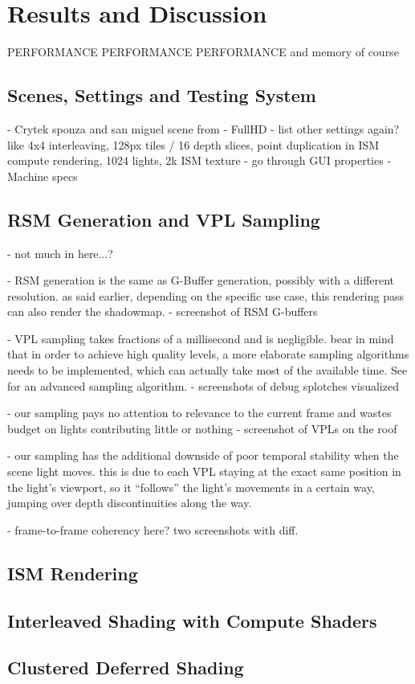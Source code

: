 

\chapter{Results and Discussion}

PERFORMANCE PERFORMANCE PERFORMANCE
and memory of course
\section{Scenes, Settings and Testing System}
- Crytek sponza and san miguel scene from \citep{McGuire2011Data}
- FullHD
- list other settings again? like 4x4 interleaving, 128px tiles / 16 depth slices, point duplication in ISM compute rendering, 1024 lights, 2k ISM texture
    - go through GUI properties
- Machine specs

\section{RSM Generation and VPL Sampling}
- not much in here...?

- RSM generation is the same as G-Buffer generation, possibly with a different resolution. as said earlier, depending on the specific use case, this rendering pass can also render the shadowmap.
- screenshot of RSM G-buffers

- VPL sampling takes fractions of a millisecond and is negligible. bear in mind that in order to achieve high quality levels, a more elaborate sampling algorithms needs to be implemented, which can actually take most of the available time. See \citep{hedman2016sequential} for an advanced sampling algorithm.
- screenshots of debug splotches visualized

- our sampling pays no attention to relevance to the current frame and wastes budget on lights contributing little or nothing
- screenshot of VPLs on the roof

- our sampling has the additional downside of poor temporal stability when the scene light moves. this is due to each VPL staying at the exact same position in the light's viewport, so it ``follows'' the light's movements in a certain way, jumping over depth discontinuities along the way.

- frame-to-frame coherency here? two screenshots with diff.

\section{ISM Rendering}

\section{Interleaved Shading with Compute Shaders}

\section{Clustered Deferred Shading}
